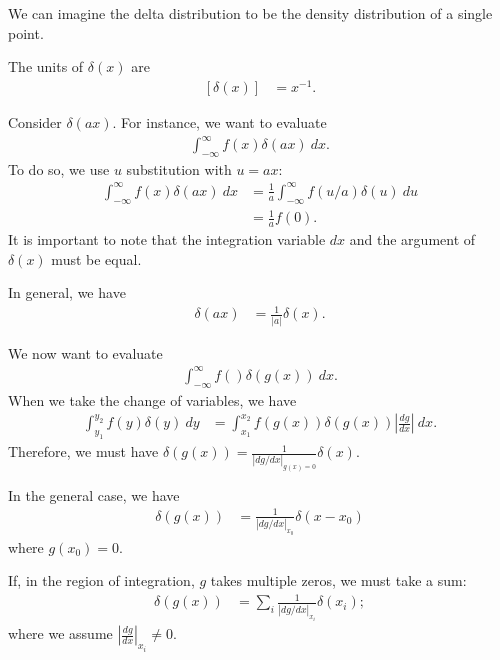 \documentclass[10pt]{mypackage}
\begin{document}
We can imagine the delta distribution to be the density distribution of a single point.\newline

The units of $\delta(x)$ are
\begin{align*}
  \left[\delta(x)\right] &= x^{-1}.
\end{align*}
\begin{example}
Consider $\delta\!\left(ax\right)$. For instance, we want to evaluate
    \begin{align*}
      \int_{-\infty}^{\infty} f(x)\delta(ax)\:dx.
    \end{align*}
    To do so, we use $u$ substitution with $u = ax$:
    \begin{align*}
      \int_{-\infty}^{\infty} f(x)\delta\!\left(ax\right)\:dx &= \frac{1}{a}\int_{-\infty}^{\infty} f\left(u/a\right)\delta(u)\:du\\
                                                            &= \frac{1}{a}f(0).
    \end{align*}
    It is important to note that the integration variable $dx$ and the argument of $\delta(x)$ must be equal.\newline

    In general, we have
    \begin{align*}
      \delta(ax) &= \frac{1}{|a|}\delta(x).
    \end{align*}

\end{example}
\begin{example}
  We now want to evaluate
  \begin{align*}
    \int_{-\infty}^{\infty} f() \delta(g(x))\:dx.
  \end{align*}
  When we take the change of variables, we have
  \begin{align*}
    \int_{y_1}^{y_2} f(y)\delta(y)\:dy &= \int_{x_1}^{x_2} f(g(x))\delta(g(x)) \left\vert \frac{dg}{dx} \right\vert\:dx.
  \end{align*}
  Therefore, we must have $\delta(g(x)) = \frac{1}{\left\vert dg/dx \right\vert_{g(x)=0}}\delta(x)$.\newline

  In the general case, we have
  \begin{align*}
    \delta\!\left(g(x)\right) &= \frac{1}{\left\vert dg/dx \right\vert_{x_0}}\delta\!\left(x-x_0\right)
  \end{align*}
  where $g\left(x_0\right) = 0$.\newline

  If, in the region of integration, $g$ takes multiple zeros, we must take a sum:
  \begin{align*}
    \delta\!\left(g(x)\right) &= \sum_{i}\frac{1}{\left\vert dg/dx \right\vert_{x_i}}\delta\!\left(x_i\right);
  \end{align*}
  where we assume $\left\vert \frac{dg}{dx} \right\vert_{x_i} \neq 0$.
\end{example}
\end{document}
